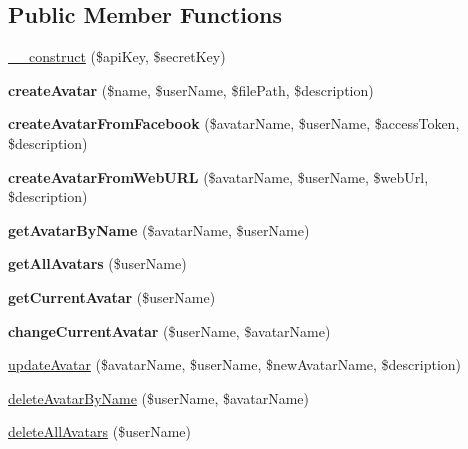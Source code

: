 \subsection*{Public Member Functions}
\begin{DoxyCompactItemize}
\item 
\hyperlink{class_avatar_service_a49f2ad222e06420736d750e167d55d7c}{\+\_\+\+\_\+construct} (\$api\+Key, \$secret\+Key)
\item 
\hypertarget{class_avatar_service_aa534cc7ed64200c4f88b53710ee183b4}{{\bfseries create\+Avatar} (\$name, \$user\+Name, \$file\+Path, \$description)}\label{class_avatar_service_aa534cc7ed64200c4f88b53710ee183b4}

\item 
\hypertarget{class_avatar_service_a6e9ef2b6f9d1bfb83669038e79ab949f}{{\bfseries create\+Avatar\+From\+Facebook} (\$avatar\+Name, \$user\+Name, \$access\+Token, \$description)}\label{class_avatar_service_a6e9ef2b6f9d1bfb83669038e79ab949f}

\item 
\hypertarget{class_avatar_service_a6ab30810cad103f42efb46dc9f7aa016}{{\bfseries create\+Avatar\+From\+Web\+U\+R\+L} (\$avatar\+Name, \$user\+Name, \$web\+Url, \$description)}\label{class_avatar_service_a6ab30810cad103f42efb46dc9f7aa016}

\item 
\hypertarget{class_avatar_service_a8c98605aa63711ef9716610396c7392b}{{\bfseries get\+Avatar\+By\+Name} (\$avatar\+Name, \$user\+Name)}\label{class_avatar_service_a8c98605aa63711ef9716610396c7392b}

\item 
\hypertarget{class_avatar_service_aa33e2be59455409109c715094be788cd}{{\bfseries get\+All\+Avatars} (\$user\+Name)}\label{class_avatar_service_aa33e2be59455409109c715094be788cd}

\item 
\hypertarget{class_avatar_service_a7caed86057a8ab7fe17f38d07801b5f3}{{\bfseries get\+Current\+Avatar} (\$user\+Name)}\label{class_avatar_service_a7caed86057a8ab7fe17f38d07801b5f3}

\item 
\hypertarget{class_avatar_service_a16b4c0a326ffa4ed6e8e45b126b3f9a0}{{\bfseries change\+Current\+Avatar} (\$user\+Name, \$avatar\+Name)}\label{class_avatar_service_a16b4c0a326ffa4ed6e8e45b126b3f9a0}

\item 
\hyperlink{class_avatar_service_a37cb87e30c3461a0457bdbe09531087d}{update\+Avatar} (\$avatar\+Name, \$user\+Name, \$new\+Avatar\+Name, \$description)
\item 
\hyperlink{class_avatar_service_a4dc0b42993128ca0c28f9f3178e81b58}{delete\+Avatar\+By\+Name} (\$user\+Name, \$avatar\+Name)
\item 
\hyperlink{class_avatar_service_aea18c8803a12507dd4d700eabdd01956}{delete\+All\+Avatars} (\$user\+Name)
\end{DoxyCompactItemize}
